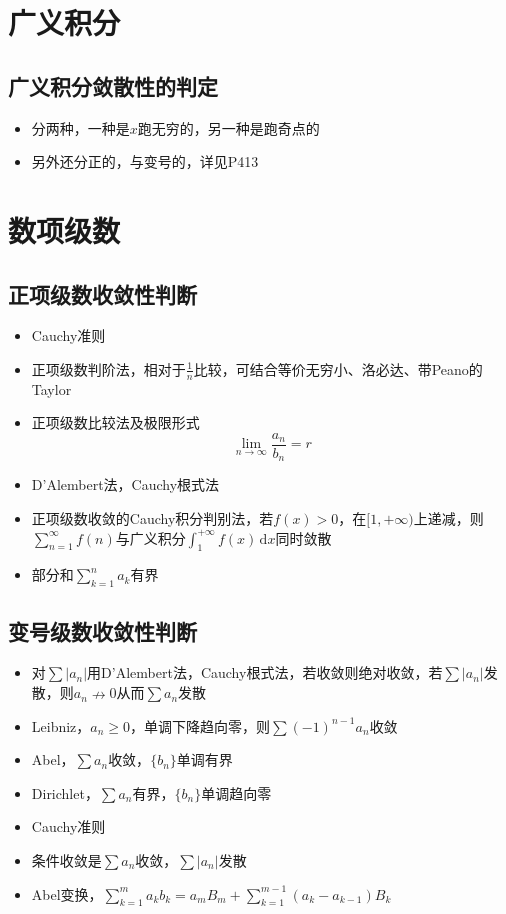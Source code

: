\documentclass[UTF8]{ctexart}
\newcommand{\ud}{\,\mathrm{d}}
\begin{document}
\section{广义积分}
\subsection{广义积分敛散性的判定}
\begin{itemize}
\item 分两种，一种是$x$跑无穷的，另一种是跑奇点的
\item 另外还分正的，与变号的，详见P413
\end{itemize}


\section{数项级数}
\subsection{正项级数收敛性判断}
\begin{itemize}
\item Cauchy准则
\item 正项级数判阶法，相对于$\frac{1}{n}$比较，可结合等价无穷小、洛必达、带Peano的Taylor
\item 正项级数比较法及极限形式
\[
\lim_{n\to\infty} \frac{a_n}{b_n} = r
\]
\item D'Alembert法，Cauchy根式法
\item 正项级数收敛的Cauchy积分判别法，若$f(x)>0$，在$[1,+\infty)$上递减，则$\sum_{n=1}^\infty f(n)$与广义积分$\int_1^{+\infty}f(x)\ud x$同时敛散
\item 部分和$\sum_{k=1}^n a_k$有界
\end{itemize}

\subsection{变号级数收敛性判断}
\begin{itemize}
\item 对$\sum |a_n|$用D'Alembert法，Cauchy根式法，若收敛则绝对收敛，若$\sum |a_n|$发散，则$a_n \nrightarrow 0$从而$\sum a_n$发散
\item Leibniz，$a_n\geq 0$，单调下降趋向零，则$\sum (-1)^{n-1}a_n$收敛
\item Abel，$\sum a_n$收敛，$\{b_n\}$单调有界
\item Dirichlet，$\sum a_n$有界，$\{b_n\}$单调趋向零
\item Cauchy准则
\item 条件收敛是$\sum a_n$收敛，$\sum|a_n|$发散
\item Abel变换，$\sum_{k=1}^m a_kb_k =a_mB_m + \sum_{k=1}^{m-1}(a_k-a_{k-1})B_k$
\end{itemize}
\end{document}
